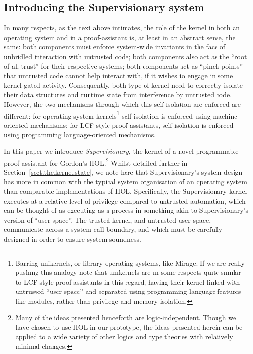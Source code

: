 \documentclass[a4paper, UKenglish, cleveref, autoref, thm-restate, colorlinks]{lipics-v2021}
\begin{document}
\subsection{Introducing the Supervisionary system}

In many respects, as the text above intimates, the role of the kernel in both an operating system and in a proof-assistant is, at least in an abstract sense, the same: both components must enforce system-wide invariants in the face of unbridled interaction with untrusted code; both components also act as the ``root of all trust'' for their respective systems; both components act as ``pinch points'' that untrusted code cannot help interact with, if it wishes to engage in some kernel-gated activity.
Consequently, both type of kernel need to correctly isolate their data structures and runtime state from interference by untrusted code.
However, the two mechanisms through which this self-isolation are enforced are different: for operating system kernels\footnote{Barring unikernels, or library operating systems, like Mirage.  If we are really pushing this analogy note that unikernels are in some respects quite similar to LCF-style proof-assistants in this regard, having their kernel linked with untrusted ``user-space'' and separated using programming language features like modules, rather than privilege and memory isolation.} self-isolation is enforced using machine-oriented mechanisms; for LCF-style proof-assistants, self-isolation is enforced using programming language-oriented mechanisms.

In this paper we introduce \emph{Supervisionary}, the kernel of a novel programmable proof-assistant for Gordon's HOL.\footnote{Many of the ideas presented henceforth are logic-independent.  Though we have chosen to use HOL in our prototype, the ideas presented herein can be applied to a wide variety of other logics and type theories with relatively minimal changes.}
Whilst detailed further in Section~\ref{sect.the.kernel.state}, we note here that Supervisionary's system design has more in common with the typical system organisation of an operating system than comparable implementations of HOL.
Specifically, the Supervisionary kernel executes at a relative level of privilege compared to untrusted automation, which can be thought of as executing as a process in something akin to Supervisionary's version of ``user space''.
The trusted kernel, and untrusted user space, communicate across a system call boundary, and which must be carefully designed in order to ensure system soundness.
\end{document}

